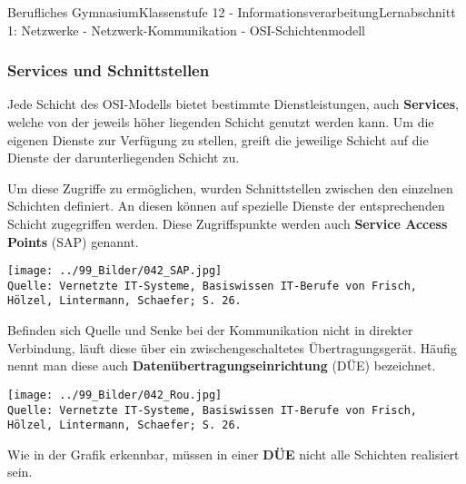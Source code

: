 \documentclass[11pt,oneside,openany,headings=optiontotoc,11pt,numbers=noenddot]{article}
\begin{document}
\begin{worksheet}{Berufliches Gymnasium}{Klassenstufe 12 - Informationsverarbeitung}{Lernabschnitt 1: Netzwerke - Netzwerk-Kommunikation - OSI-Schichtenmodell}
		\subsubsection{Services und Schnittstellen}
		Jede Schicht des OSI-Modells bietet bestimmte Dienstleistungen, auch \textbf{Services}, welche von der jeweils höher liegenden Schicht genutzt werden kann. Um die eigenen Dienste zur Verfügung zu stellen, greift die jeweilige Schicht auf die Dienste der darunterliegenden Schicht zu.\\
		\begin{minipage}{0.58\textwidth}
			Um diese Zugriffe zu ermöglichen, wurden Schnittstellen zwischen den einzelnen Schichten definiert. An diesen können auf spezielle Dienste der entsprechenden Schicht zugegriffen werden. Diese Zugriffspunkte werden auch \textbf{Service Access Points} (SAP) genannt.
		\end{minipage}
		\hfill
		\begin{minipage}{0.4\textwidth}
			\texttt{[image: ../99\_Bilder/042\_SAP.jpg]}\\
			\tiny{\texttt{Quelle: Vernetzte IT-Systeme, Basiswissen IT-Berufe von Frisch, Hölzel, Lintermann, Schaefer; S. 26.}}\normalsize\\
		\end{minipage}
		Befinden sich Quelle und Senke bei der Kommunikation nicht in direkter Verbindung, läuft diese über ein zwischengeschaltetes Übertragungsgerät. Häufig nennt man diese auch \textbf{Datenübertragungseinrichtung} (DÜE) bezeichnet.\\
		\par\noindent
		\begin{center}
			\texttt{[image: ../99\_Bilder/042\_Rou.jpg]}\\
			\tiny{\texttt{Quelle: Vernetzte IT-Systeme, Basiswissen IT-Berufe von Frisch, Hölzel, Lintermann, Schaefer; S. 26.}}\normalsize\\
		\end{center}
		Wie in der Grafik erkennbar, müssen in einer \textbf{DÜE} nicht alle Schichten realisiert sein.

\end{worksheet}
\end{document}
